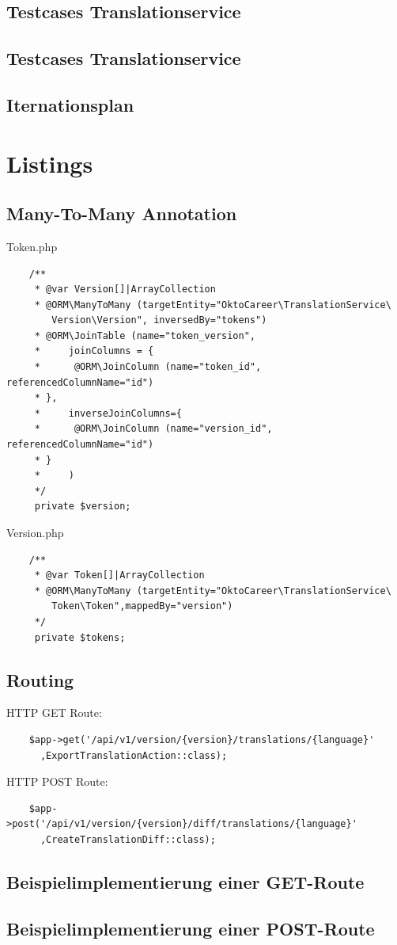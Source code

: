 \documentclass[10pt, oneside]{article}
\begin{document}
  \subsection{Testcases Translationservice}\label{sec:test:ts}
  \subsection{Testcases Translationservice}\label{sec:test:tu}
  \subsection{Iternationsplan}\label{sec:iterationplan}
  \section{Listings}
  \subsection{Many-To-Many Annotation}\label{sec:lst:mtmA}
    Token.php
  \begin{lstlisting}
    /**
     * @var Version[]|ArrayCollection
     * @ORM\ManyToMany (targetEntity="OktoCareer\TranslationService\
        Version\Version", inversedBy="tokens")
     * @ORM\JoinTable (name="token_version",
     *     joinColumns = {
     *      @ORM\JoinColumn (name="token_id", referencedColumnName="id")
     * },
     *     inverseJoinColumns={
     *      @ORM\JoinColumn (name="version_id", referencedColumnName="id")
     * }
     *     )
     */
     private $version;
  \end{lstlisting}
  Version.php
  \begin{lstlisting}
    /**
     * @var Token[]|ArrayCollection
     * @ORM\ManyToMany (targetEntity="OktoCareer\TranslationService\
        Token\Token",mappedBy="version")
     */
     private $tokens;
  \end{lstlisting}
  \subsection{Routing}\label{sec:lst:routes}
  HTTP GET Route:
  \begin{lstlisting}
    $app->get('/api/v1/version/{version}/translations/{language}'
      ,ExportTranslationAction::class);
  \end{lstlisting}
  HTTP POST Route:
  \begin{lstlisting}
    $app->post('/api/v1/version/{version}/diff/translations/{language}'
      ,CreateTranslationDiff::class);
  \end{lstlisting}
  \subsection{Beispielimplementierung einer GET-Route}\label{lst:impl:bl:GET}
  \subsection{Beispielimplementierung einer POST-Route}\label{lst:impl:bl:POST}
\end{document}

